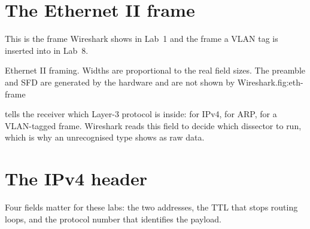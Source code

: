 \section{The Ethernet II frame}
This is the frame Wireshark shows in Lab~1 and the frame a VLAN tag is
inserted into in Lab~8.

\begin{utpfig}{Ethernet II framing. Widths are proportional to the
real field sizes. The preamble and SFD are generated by the hardware and are not
shown by Wireshark.}{fig:eth-frame}
\end{utpfig}

\begin{keyidea}
 tells the receiver which Layer-3 protocol is inside:
 for IPv4,  for ARP,  for a
VLAN-tagged frame. Wireshark reads this field to decide which dissector
to run, which is why an unrecognised type shows as raw data.
\end{keyidea}

\section{The IPv4 header}
Four fields matter for these labs: the two addresses, the TTL that stops
routing loops, and the protocol number that identifies the payload.

